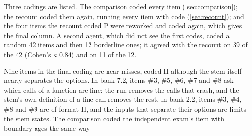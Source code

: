 Three codings are listed.  The comparison coded every item
(\cref{sec:comparison}); the recount coded them again, running every item
with code (\cref{sec:recount}); and the four items the recount coded P
were reworked and coded again, which gives the final column.  A second
agent, which did not see the first codes, coded a random 42 items and
then 12 borderline ones; it agreed with the recount on 39 of the 42
(Cohen's $\kappa$ 0.84) and on 11 of the 12.

Nine items in the final coding are near misses, coded H although the
stem itself nearly separates the options.  In bank 7.2, items \#3, \#5,
\#6, \#7 and \#8 ask which calls of a function are fine: the run removes
the calls that crash, and the stem's own definition of a fine call
removes the rest.  In bank 2.2, items \#3, \#4, \#8 and \#9 are of
format H, and the inputs that separate their options are limits the stem
states.  The comparison coded the independent exam's item with boundary
ages the same way.

